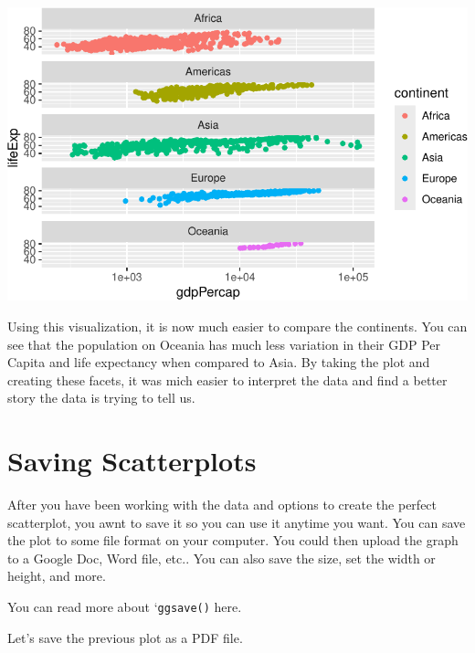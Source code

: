 \documentclass[
  letterpaper,
  DIV=11,
  numbers=noendperiod]{scrreprt}
\begin{document}
\includegraphics{Advanced_Scatterplot_Techniques_files/figure-pdf/unnamed-chunk-18-1.pdf}

Using this visualization, it is now much easier to compare the
continents. You can see that the population on Oceania has much less
variation in their GDP Per Capita and life expectancy when compared to
Asia. By taking the plot and creating these facets, it was mich easier
to interpret the data and find a better story the data is trying to tell
us.

\section*{Saving Scatterplots}\label{saving-scatterplots}


After you have been working with the data and options to create the
perfect scatterplot, you awnt to save it so you can use it anytime you
want. You can save the plot to some file format on your computer. You
could then upload the graph to a Google Doc, Word file, etc.. You can
also save the size, set the width or height, and more.

You can read more about `\texttt{ggsave()} here.

Let's save the previous plot as a PDF file.
\end{document}

